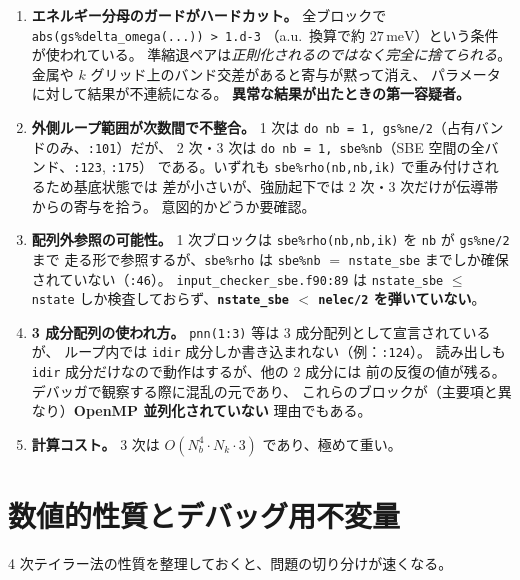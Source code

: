 \documentclass[dvipdfmx,a4paper,11pt]{jsarticle}
\newcommand{\file}[1]{\texttt{#1}}
\begin{document}
\begin{enumerate}
\item \textbf{エネルギー分母のガードがハードカット。}
      全ブロックで \verb|abs(gs%delta_omega(...)) > 1.d-3|
      （a.u.\ 換算で約 $27\,\mathrm{meV}$）という条件が使われている。
      準縮退ペアは\emph{正則化されるのではなく完全に捨てられる}。
      金属や $k$ グリッド上のバンド交差があると寄与が黙って消え、
      パラメータに対して結果が不連続になる。
      \textbf{異常な結果が出たときの第一容疑者。}

\item \textbf{外側ループ範囲が次数間で不整合。}
      1 次は \verb|do nb = 1, gs%ne/2|（占有バンドのみ、\file{:101}）だが、
      2 次・3 次は \verb|do nb = 1, sbe%nb|（SBE 空間の全バンド、\file{:123}, \file{:175}）
      である。いずれも \verb|sbe%rho(nb,nb,ik)| で重み付けされるため基底状態では
      差が小さいが、強励起下では 2 次・3 次だけが伝導帯からの寄与を拾う。
      意図的かどうか要確認。

\item \textbf{配列外参照の可能性。}
      1 次ブロックは \verb|sbe%rho(nb,nb,ik)| を \verb|nb| が \verb|gs%ne/2| まで
      走る形で参照するが、\verb|sbe%rho| は \file{sbe\%nb} $=$ \file{nstate\_sbe}
      までしか確保されていない（\file{:46}）。
      \file{input\_checker\_sbe.f90:89} は \file{nstate\_sbe} $\le$ \file{nstate}
      しか検査しておらず、\textbf{\file{nstate\_sbe} $<$ \file{nelec/2} を弾いていない}。

\item \textbf{3 成分配列の使われ方。}
      \verb|pnn(1:3)| 等は 3 成分配列として宣言されているが、
      ループ内では \verb|idir| 成分しか書き込まれない（例：\file{:124}）。
      読み出しも \verb|idir| 成分だけなので動作はするが、他の 2 成分には
      前の反復の値が残る。デバッガで観察する際に混乱の元であり、
      これらのブロックが（主要項と異なり）\textbf{OpenMP 並列化されていない}
      理由でもある。

\item \textbf{計算コスト。}
      3 次は $O(N_b^4 \cdot N_k \cdot 3)$ であり、極めて重い。
\end{enumerate}

\section{数値的性質とデバッグ用不変量}
\label{sec:numerics}

4 次テイラー法の性質を整理しておくと、問題の切り分けが速くなる。
\end{document}
